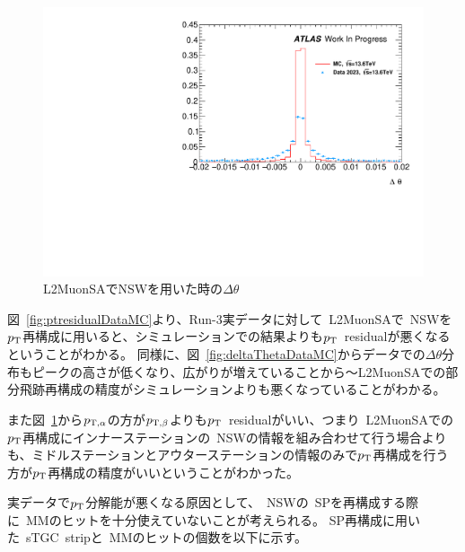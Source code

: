 \begin{figure}[H]
    \centering
    \includegraphics[clip, width=12cm]{fig/5/deltaTheta_NSW.pdf}
    \caption{L2MuonSAでNSWを用いた時の$\Delta \theta$}
    \label{fig:ptresidualAlphaBeta}
\end{figure}


図~\ref{fig:ptresidualDataMC}より、Run-3実データに対して~L2MuonSAで~NSWを$p_\mathrm{T}$再構成に用いると、シミュレーションでの結果よりも$p_\mathrm{T}$~residualが悪くなるということがわかる。
同様に、図~\ref{fig:deltaThetaDataMC}からデータでの$\Delta \theta$分布もピークの高さが低くなり、広がりが増えていることから～L2MuonSAでの部分飛跡再構成の精度がシミュレーションよりも悪くなっていることがわかる。

また図~\ref{fig:ptresidualAlphaBeta}から$p_{\rm{T, \alpha}}$の方が$p_{\rm{T, \beta}}$よりも$p_\mathrm{T}$~residualがいい、つまり~L2MuonSAでの$p_\mathrm{T}$再構成にインナーステーションの~NSWの情報を組み合わせて行う場合よりも、ミドルステーションとアウターステーションの情報のみで$p_\mathrm{T}$再構成を行う方が$p_\mathrm{T}$再構成の精度がいいということがわかった。

実データで$p_\mathrm{T}$分解能が悪くなる原因として、~NSWの~SPを再構成する際に~MMのヒットを十分使えていないことが考えられる。
SP再構成に用いた~sTGC~stripと~MMのヒットの個数を以下に示す。


